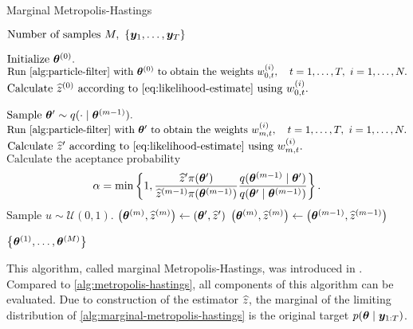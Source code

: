 \begin{algorithm}[ht]
    \caption{Marginal Metropolis-Hastings}
    \label{alg:marginal-metropolis-hastings}
    \begin{algorithmic}[1]
        \Input $\text{Number of samples } M,\ \left\{\by_1, \ldots, \by_T\right\}$
        
        \State $\text{Initialize } \bm{\theta}^{(0)}.$
        \State $\text{Run \autoref{alg:particle-filter} with } \btheta^{(0)} \text{ to obtain the weights } w_{0,t}^{(i)}, \quad t = 1, \ldots, T,\ i = 1, \ldots, N.$
        \State $\text{Calculate } \widehat{z}^{(0)} \text{ according to \eqref{eq:likelihood-estimate} using } w_{0,t}^{(i)}.$
        
        \State $\text{Sample } \bm{\theta}^\prime \sim q(\cdot \mid \bm{\theta}^{(m-1)}).$
        \State $\text{Run \autoref{alg:particle-filter} with } \btheta^\prime \text{ to obtain the weights } w_{m,t}^{(i)}, \quad t = 1, \ldots, T, \ i = 1, \ldots, N.$
        \State $\text{Calculate } \widehat{z}^\prime \text{ according to \eqref{eq:likelihood-estimate} using } w_{m,t}^{(i)}.$
        \State $\text{Calculate the aceptance probability } $ \begin{equation*} \label{eq:acceptance-probability-tractable}
        \alpha = \min \left\{1, \frac{\widehat{z}^\prime \pi(\bm{\theta}^\prime)}{\widehat{z}^{(m-1)} \pi(\bm{\theta}^{(m-1)})} \frac{q(\bm{\theta}^{(m-1)} \mid \bm{\theta}^\prime)}{q(\bm{\theta}^\prime \mid \bm{\theta}^{(m-1)})} \right\}.
        \end{equation*}
        \State $\text{Sample } u \sim \mathcal{U}(0,1).$
        \State $\left( \bm{\theta}^{(m)}, \widehat{z}^{(m)} \right) \gets \left( \bm{\theta}^\prime, \widehat{z}^\prime \right)$ 
        \Else
        \State $\left( \bm{\theta}^{(m)}, \widehat{z}^{(m)} \right) \gets \left( \bm{\theta}^{(m-1)}, \widehat{z}^{(m-1)} \right)$ 
        \EndIf
        \EndFor
        
        \Output $\left\{ \bm{\theta}^{(1)}, \ldots, \bm{\theta}^{(M)} \right\}$
    \end{algorithmic}
\end{algorithm}

This algorithm, called marginal Metropolis-Hastings, was introduced in \cite{andrieu}. Compared to \autoref{alg:metropolis-hastings}, all components of this algorithm can be evaluated. Due to construction of the estimator $\widehat{z}$, the marginal of the limiting distribution of \autoref{alg:marginal-metropolis-hastings} is the original target $p(\bm{\theta} \mid \bm{y}_{1:T})$.